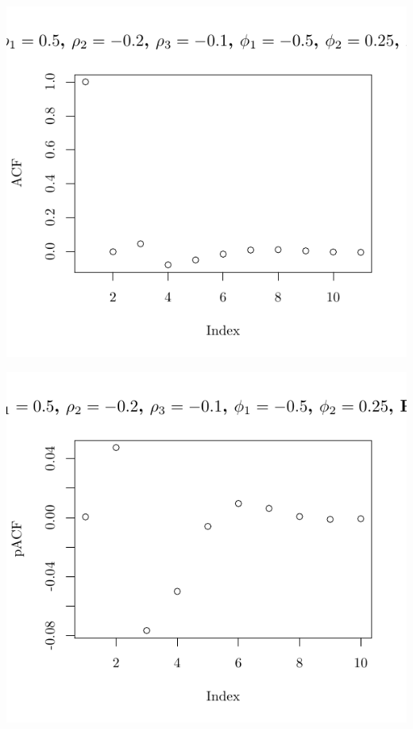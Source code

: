 \documentclass[10pt]{paper}\usepackage[]{graphicx}\usepackage[]{color}
\makeatletter
\def\maxwidth{ %
  \ifdim\Gin@nat@width>\linewidth
    \linewidth
  \else
    \Gin@nat@width
  \fi
}
\newenvironment{knitrout}{}{} %
\makeatother
\begin{document}
\begin{knitrout}
{\centering \includegraphics[width=\maxwidth]{figure/graphics-plotter-179} 

}




{\centering \includegraphics[width=\maxwidth]{figure/graphics-plotter-180} 

}





\end{knitrout}
\end{document}
